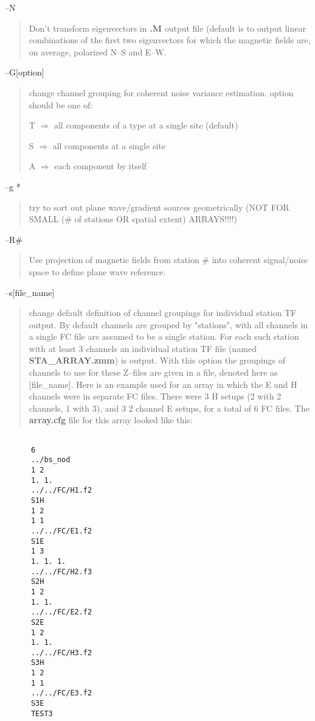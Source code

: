 --N
\begin{quote}
Don't transform eigenvectors in {\bf .M} output file (default is to output
linear combinations of the first two eigenvectors for which the
magnetic fields are, on average, polarized N--S and E--W.
\end{quote}

--G[option]
\begin{quote}
change channel grouping for coherent noise variance estimation.
option should be one of:

T $\Longrightarrow$ all components of a type at a single site (default)
        
S $\Longrightarrow$ all components at a single site

A $\Longrightarrow$ each component by itself
\end{quote}
--g *
\begin{quote}
try to sort out plane wave/gradient sources geometrically
(NOT FOR SMALL (\# of stations OR spatial extent) ARRAYS!!!!)
\end{quote}

--R\#
\begin{quote}
Use projection of magnetic fields from
station \# into coherent signal/noise space
to define plane wave reference.

\end{quote}

--s[file\_name]
\begin{quote}
change default definition of channel groupings for individual station
TF output.   By default channels are grouped by "stations", with all channels
in a single FC file are assumed to be a single station.  For each such station with
at least 3 channels an individual station TF file 
(named {\bf STA\_ARRAY.zmm}) is output.
With this option the groupings of channels to use for these Z--files are given in
a file,  denoted here as [file\_name].   Here is an example used for an array in
which the E and H channels were in separate FC files. 
There were 3 H setups (2 with
2 channels, 1 with 3), and 3 2 channel E setups, for a total of 6 FC files.  The
{\bf array.cfg} file for this array looked like this:
\end{quote}

\small
\begin{verbatim}

      6
      ../bs_nod
      1 2
      1. 1.
      ../../FC/H1.f2
      S1H
      1 2
      1 1
      ../../FC/E1.f2
      S1E
      1 3
      1. 1. 1.
      ../../FC/H2.f3
      S2H
      1 2
      1. 1.
      ../../FC/E2.f2
      S2E
      1 2
      1. 1.
      ../../FC/H3.f2
      S3H
      1 2
      1 1
      ../../FC/E3.f2
      S3E
      TEST3
\end{verbatim}
\normalsize

